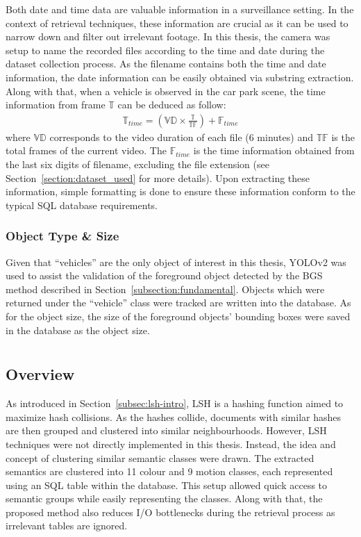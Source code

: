 Both date and time data are valuable information in a surveillance setting. In the context of retrieval techniques, these information are crucial as it can be used to narrow down and filter out irrelevant footage. In this thesis, the camera was setup to name the recorded files according to the time and date during the dataset collection process. As the filename contains both the time and date information, the date information can be easily obtained via substring extraction. Along with that, when a vehicle is observed in the car park scene, the time information from frame $\mathbb{T}$ can be deduced as follow:
\begin{align}
\label{eq:timecount}
    \mathbb{T}_{time}  = (\mathbb{VD} \times \frac{\mathbb{T}}{\mathbb{TF}}) + \mathbb{F}_{time}
\end{align}
where $\mathbb{VD}$ corresponds to the video duration of each file (6 minutes) and $\mathbb{TF}$ is the total frames of the current video. The $\mathbb{F}_{time}$ is the time information obtained from the last six digits of filename, excluding the file extension (see Section~\ref{section:dataset_used} for more details). Upon extracting these information, simple formatting is done to ensure these information conform to the typical SQL database requirements.


\subsubsection{Object Type \& Size}
\label{objecttype}
Given that ``vehicles'' are the only object of interest in this thesis, YOLOv2 was used to assist the validation of the foreground object detected by the BGS method described in Section~\ref{subsection:fundamental}. Objects which were returned under the ``vehicle'' class were tracked are written into the database. As for the object size, the size of the foreground objects' bounding boxes were saved in the database as the object size.


\section{\versionOneExt}
\label{section:semantic_lsh}

\subsection{Overview}
As introduced in Section~\ref{subsec:lsh-intro}, LSH is a hashing function aimed to maximize hash collisions.
As the hashes collide, documents with similar hashes are then grouped and clustered into similar neighbourhoods.
However, LSH techniques were not directly implemented in this thesis. Instead, the idea and concept of clustering similar semantic classes were drawn.
The extracted semantics are clustered into 11 colour and 9 motion classes, each represented using an SQL table within the database.
This setup allowed quick access to semantic groups while easily representing the classes. Along with that, the proposed method also reduces I/O bottlenecks during the retrieval process as irrelevant tables are ignored.


